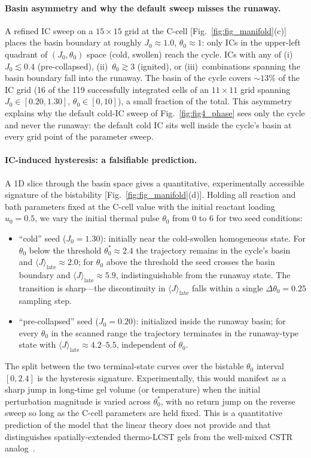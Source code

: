 \paragraph{Basin asymmetry and why the default sweep misses the
runaway.}
A refined IC sweep on a $15\times 15$ grid at the C-cell
[Fig.~\ref{fig:fig_manifold}(c)] places the basin boundary at
roughly $J_0\!\approx\!1.0$, $\theta_0\!\approx\!1$: only ICs in the
upper-left quadrant of $(J_0, \theta_0)$ space (cold, swollen) reach
the cycle.  ICs with any of (i)~$J_0\!\lesssim\!0.4$ (pre-collapsed),
(ii)~$\theta_0\!\gtrsim\!3$ (ignited), or (iii)~combinations
spanning the basin boundary fall into the runaway.  The basin of
the cycle covers
$\sim\!13\%$ of the IC grid (16 of the 119 successfully integrated
cells of an $11{\times}11$ grid spanning $J_0\in[0.20,1.30]$,
$\theta_0\in[0,10]$), a small fraction of the total. This asymmetry explains why the default
cold-IC sweep of Fig.~\ref{fig:fig4_phase} sees only the cycle and
never the runaway: the default cold IC sits well inside the cycle's
basin at every grid point of the parameter sweep.

\paragraph{IC-induced hysteresis: a falsifiable prediction.}
A 1D slice through the basin space gives a quantitative,
experimentally accessible signature of the bistability
[Fig.~\ref{fig:fig_manifold}(d)].  Holding all reaction and bath
parameters fixed at the C-cell value with the initial reactant
loading $u_0=0.5$, we vary the initial thermal pulse $\theta_0$ from
$0$ to $6$ for two seed conditions:
\begin{itemize}
\item ``cold'' seed ($J_0=1.30$): initially near the cold-swollen
  homogeneous state.  For $\theta_0$ below the threshold
  $\theta_0^{\!*}\!\approx\!2.4$ the trajectory remains in the
  cycle's basin and
  $\langle J\rangle_\mathrm{late}\!\approx\!2.0$;
  for $\theta_0$ above the threshold the seed crosses the basin
  boundary and
  $\langle J\rangle_\mathrm{late}\!\approx\!5.9$,
  indistinguishable from the runaway state.  The transition is
  sharp—the discontinuity in $\langle J\rangle_\mathrm{late}$ falls
  within a single $\Delta\theta_0=0.25$ sampling step.
\item ``pre-collapsed'' seed ($J_0=0.20$): initialized inside the
  runaway basin; for every $\theta_0$ in the scanned range the
  trajectory terminates in the runaway-type state with
  $\langle J\rangle_\mathrm{late}\!\approx\!4.2\text{--}5.5$,
  independent of $\theta_0$.
\end{itemize}
The split between the two terminal-state curves over the bistable
$\theta_0$ interval $[0, 2.4]$ is the hysteresis signature.
Experimentally, this would manifest as a sharp jump in long-time
gel volume (or temperature) when the initial perturbation magnitude
is varied across $\theta_0^{\!*}$, with no return jump on the
reverse sweep so long as the C-cell parameters are held fixed.
This is a quantitative prediction of the model that the linear
theory does not provide and that distinguishes spatially-extended
thermo-LCST gels from the well-mixed CSTR
analog~\cite{Uppal1974}.

